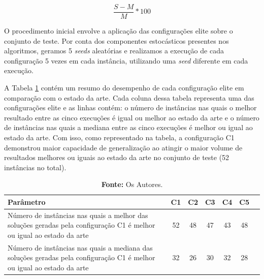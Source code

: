 \begin{equation} \label{eq:desv_percent}
     \frac{S-M}{M} * 100
\end{equation}

O procedimento inicial envolve a aplicação das configurações elite sobre o conjunto de teste. Por conta dos componentes estocásticos presentes nos algoritmos, geramos 5 \textit{seeds} aleatórias e realizamos a execução de cada configuração 5 vezes em cada instância, utilizando uma \textit{seed} diferente em cada execução.

A Tabela \ref{tab:results_confs} contém um resumo do desempenho de cada configuração elite em comparação com o estado da arte. Cada coluna dessa tabela representa uma das configurações elite e as linhas contém: o número de instâncias nas quais o melhor resultado entre as cinco execuções é igual ou melhor ao estado da arte e o número de instâncias nas quais a mediana entre as cinco execuções é melhor ou igual ao estado da arte.
Com isso, como representado na tabela, a configuração C1 demonstrou maior capacidade de generalização ao atingir o maior volume de resultados melhores ou iguais ao estado da arte no conjunto de teste (52 instâncias no total).

\begin{table}[ht]
\centering
\caption{Resumo dos resultados das configurações elite.}
\label{tab:results_confs}
\begin{tabularx}{\textwidth}{Xcccccc}
\hline
\textbf{Parâmetro} & \textbf{C1} & \textbf{C2} & \textbf{C3} & \textbf{C4} & \textbf{C5} \\ \hline
Número de instâncias nas quais a melhor das soluções geradas pela configuração C1 é melhor ou igual ao estado da arte & 52 & 48 & 47 & 43 & 48  \\ 
Número de instâncias nas quais a mediana das soluções geradas pela configuração C1 é melhor ou igual ao estado da arte & 32 & 26 & 30 & 32 & 28  \\ 
\hline
\end{tabularx}
\caption*{\small \textbf{Fonte:} Os Autores.}
\end{table}

